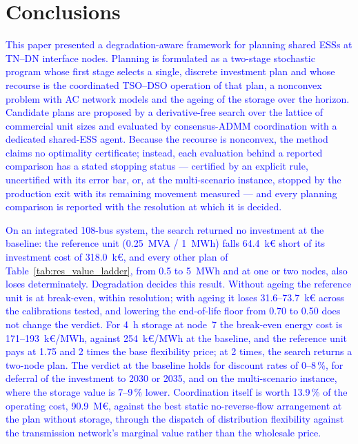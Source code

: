 \documentclass[preprint,12pt]{elsarticle}
\begin{document}
\section{Conclusions}
\label{sec:conclusions}

\textcolor{blue}{
    This paper presented a degradation-aware framework for planning shared ESSs at TN--DN interface nodes. Planning is formulated as a two-stage stochastic program whose first stage selects a single, discrete investment plan and whose recourse is the coordinated TSO--DSO operation of that plan, a nonconvex problem with AC network models and the ageing of the storage over the horizon. Candidate plans are proposed by a derivative-free search over the lattice of commercial unit sizes and evaluated by consensus-ADMM coordination with a dedicated shared-ESS agent. Because the recourse is nonconvex, the method claims no optimality certificate; instead, each evaluation behind a reported comparison has a stated stopping status --- certified by an explicit rule, uncertified with its error bar, or, at the multi-scenario instance, stopped by the production exit with its remaining movement measured --- and every planning comparison is reported with the resolution at which it is decided.
}

\textcolor{blue}{
    On an integrated 108-bus system, the search returned no investment at the baseline: the reference unit (0.25~MVA / 1~MWh) falls 64.4~k\euro{} short of its investment cost of 318.0~k\euro{}, and every other plan of Table~\ref{tab:res_value_ladder}, from 0.5 to 5~MWh and at one or two nodes, also loses determinately. Degradation decides this result. Without ageing the reference unit is at break-even, within resolution; with ageing it loses 31.6--73.7~k\euro{} across the calibrations tested, and lowering the end-of-life floor from 0.70 to 0.50 does not change the verdict. For 4~h storage at node~7 the break-even energy cost is 171--193~k\euro/MWh, against 254~k\euro/MWh at the baseline, and the reference unit pays at 1.75 and 2 times the base flexibility price; at 2 times, the search returns a two-node plan. The verdict at the baseline holds for discount rates of 0--8\,\%, for deferral of the investment to 2030 or 2035, and on the multi-scenario instance, where the storage value is 7--9\,\% lower. Coordination itself is worth 13.9\,\% of the operating cost, 90.9~M\euro{}, against the best static no-reverse-flow arrangement at the plan without storage, through the dispatch of distribution flexibility against the transmission network's marginal value rather than the wholesale price.
}
\end{document}
